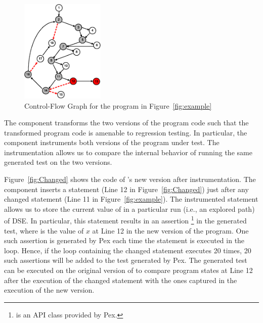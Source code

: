 	\begin{figure}[t]
    \centering
        \includegraphics[width=4cm, keepaspectratio]{Figures/exampleCFG}
    \caption{Control-Flow Graph for the program in Figure~\ref{fig:example}}
    \label{fig:CFG}
    
\end{figure}

The  component transforms the two versions of the
program code such that the transformed program code is
amenable to regression testing. In particular, the  component
instruments both versions of the program under test. The
instrumentation allows us to compare the internal behavior
of running the same generated test on the two versions.
	
	Figure~\ref{fig:Changed} shows the code of 's new version after instrumentation. The  component inserts a statement (Line 12 in Figure~\ref{fig:Changed}) just after any changed	 statement (Line 11 in Figure~\ref{fig:example}). The instrumented statement allows us to store the current value of  in a particular run (i.e., an explored path) of DSE. In particular, this statement results in an assertion \footnote{ is an API class provided by Pex.} in the generated test, where  is the value of $x$ at Line 12 in the new version of the program. One such assertion is generated by Pex each time the statement is executed in the loop. Hence, if the loop containing the changed statement executes 20 times, 20 such assertions will be added to the test generated by Pex.
The generated test can be executed on the original version of  to compare program states at Line 12 after the execution of the changed statement with the ones captured in the execution of the new version. 
			
